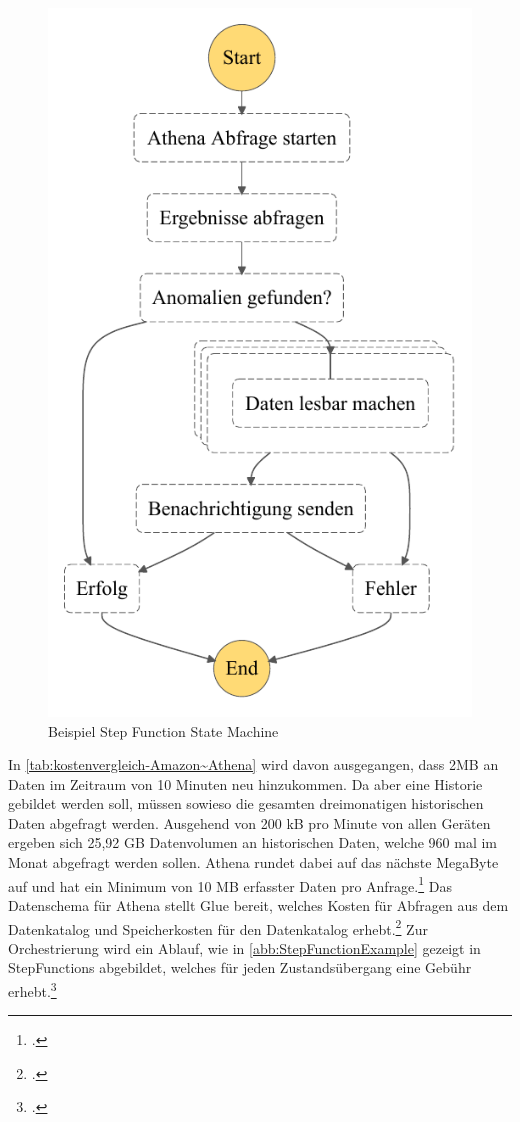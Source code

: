 \begin{figure}[H]
\centering
\includegraphics[height=0.45\textheight]{graphics/Step-Function-Athena.pdf}
\caption{Beispiel Step Function State Machine}
\label{abb:StepFunctionExample}
\end{figure}

In \autoref{tab:kostenvergleich-Amazon~Athena} wird davon ausgegangen, dass 2MB an Daten im Zeitraum von 10 Minuten neu hinzukommen. Da aber eine Historie gebildet werden soll, müssen sowieso die gesamten dreimonatigen historischen Daten abgefragt werden. Ausgehend von 200 kB pro Minute von allen Geräten ergeben sich 25,92 GB Datenvolumen an historischen Daten, welche 960 mal im Monat abgefragt werden sollen. Athena rundet dabei auf das nächste MegaByte auf und hat ein Minimum von 10 MB erfasster Daten pro Anfrage.\footcite[Vgl.][]{AmazonWebServicesInc..o.J.t} Das Datenschema für Athena stellt Glue bereit, welches Kosten für Abfragen aus dem Datenkatalog und Speicherkosten für den Datenkatalog erhebt.\footcite[Vgl.][]{AmazonWebServicesInc..o.J.u} Zur Orchestrierung wird ein Ablauf, wie in \autoref{abb:StepFunctionExample} gezeigt in StepFunctions abgebildet, welches für jeden Zustandsübergang eine Gebühr erhebt.\footcite[Vgl.][]{AmazonWebServicesInc..o.J.v}

